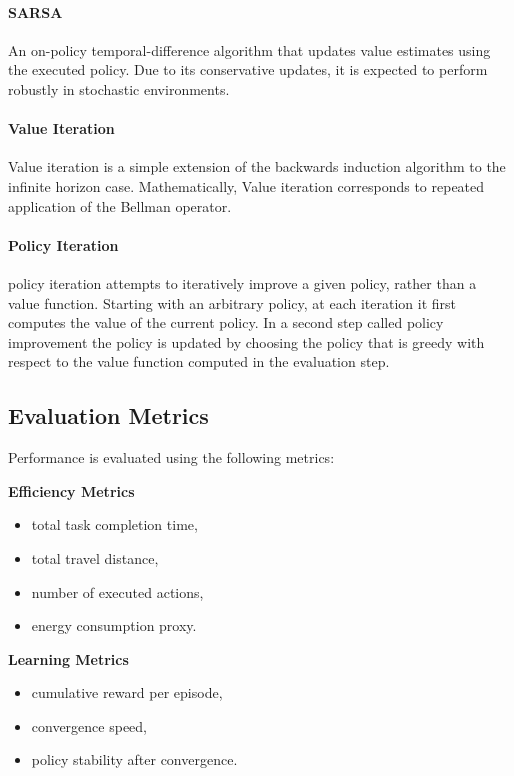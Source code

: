 \documentclass{article}
\begin{document}
\paragraph{SARSA}
An on-policy temporal-difference algorithm that updates value estimates using the executed policy. Due to its conservative updates, it is expected to perform robustly in stochastic environments.

\paragraph{Value Iteration}
Value iteration is a simple extension of
the backwards induction algorithm to the infinite horizon case. 
Mathematically, Value iteration corresponds to repeated application of the Bellman operator. 

\paragraph{Policy Iteration}
policy iteration attempts to iteratively improve a given
policy, rather than a value function. Starting with an arbitrary policy, at each
iteration it first computes the value of the current policy. In a second step called policy improvement the policy is updated by choosing the policy that is greedy with respect to the value function computed in the evaluation step.

\subsection{Evaluation Metrics}

Performance is evaluated using the following metrics:

\textbf{Efficiency Metrics}

\begin{itemize}
    \item total task completion time,
    \item total travel distance,
    \item number of executed actions,
    \item energy consumption proxy.
\end{itemize}

\textbf{Learning Metrics}
\begin{itemize}
    \item cumulative reward per episode,
    \item convergence speed,
    \item policy stability after convergence.
\end{itemize}
\end{document}

